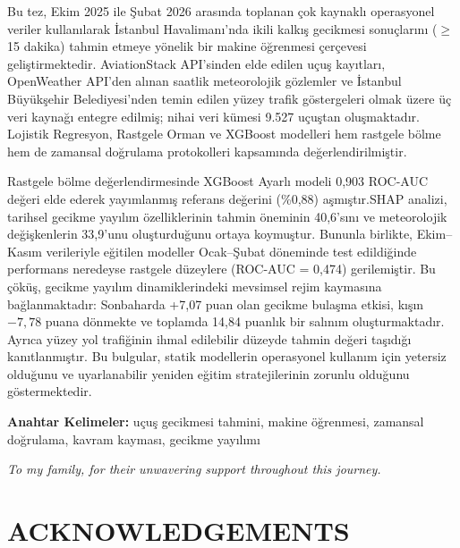 \documentclass{report}
\begin{document}
Bu tez, Ekim 2025 ile Şubat 2026 arasında toplanan çok kaynaklı operasyonel veriler kullanılarak İstanbul Havalimanı'nda ikili kalkış gecikmesi sonuçlarını ($\geq$ 15 dakika) tahmin etmeye yönelik bir makine öğrenmesi çerçevesi geliştirmektedir. AviationStack API'sinden elde edilen uçuş kayıtları, OpenWeather API'den alınan saatlik meteorolojik gözlemler ve İstanbul Büyükşehir Belediyesi'nden temin edilen yüzey trafik göstergeleri olmak üzere üç veri kaynağı entegre edilmiş; nihai veri kümesi 9.527 uçuştan oluşmaktadır. Lojistik Regresyon, Rastgele Orman ve XGBoost modelleri hem rastgele bölme hem de zamansal doğrulama protokolleri kapsamında değerlendirilmiştir.

Rastgele bölme değerlendirmesinde XGBoost Ayarlı modeli 0{,}903 ROC-AUC değeri elde ederek yayımlanmış referans değerini (\%0{,}88) aşmıştır.SHAP analizi, tarihsel gecikme yayılım özelliklerinin tahmin öneminin 40,6'sını ve meteorolojik değişkenlerin 33,9'unu oluşturduğunu ortaya koymuştur. Bununla birlikte, Ekim--Kasım verileriyle eğitilen modeller Ocak--Şubat döneminde test edildiğinde performans neredeyse rastgele düzeylere (ROC-AUC = 0{,}474) gerilemiştir. Bu çöküş, gecikme yayılım dinamiklerindeki mevsimsel rejim kaymasına bağlanmaktadır: Sonbaharda +7{,}07 puan olan gecikme bulaşma etkisi, kışın $-7{,}78$ puana dönmekte ve toplamda 14{,}84 puanlık bir salınım oluşturmaktadır. Ayrıca yüzey yol trafiğinin ihmal edilebilir düzeyde tahmin değeri taşıdığı kanıtlanmıştır. Bu bulgular, statik modellerin operasyonel kullanım için yetersiz olduğunu ve uyarlanabilir yeniden eğitim stratejilerinin zorunlu olduğunu göstermektedir.

\vspace{1cm}

\noindent \textbf{Anahtar Kelimeler:} uçuş gecikmesi tahmini, makine öğrenmesi, zamansal doğrulama, kavram kayması, gecikme yayılımı
 
\newpage
\thispagestyle{empty}
\vspace*{5cm}
\begin{center}
\textit{To my family, for their unwavering support throughout this journey.}
\end{center}
\newpage

\chapter*{ACKNOWLEDGEMENTS}
\end{document}
